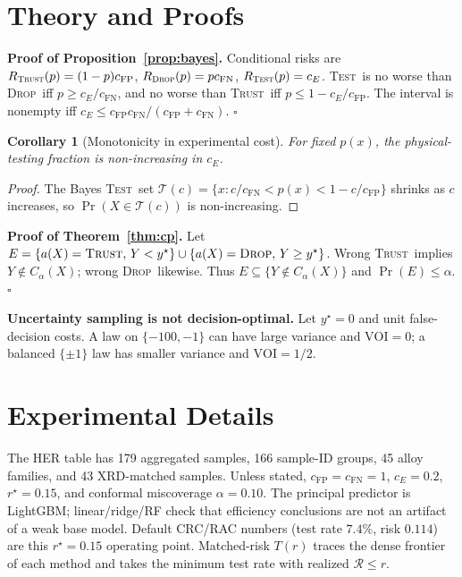 \documentclass{article}
\newtheorem{corollary}{Corollary}
\newcommand{\test}{\textsc{Test}}
\newcommand{\trust}{\textsc{Trust}}
\newcommand{\dropa}{\textsc{Drop}}
\newcommand{\risk}{\mathcal{R}}
\begin{document}
\newpage
\appendix

\section{Theory and Proofs}
\label{app:proofs}

\textbf{Proof of Proposition~\ref{prop:bayes}.}
Conditional risks are
$R_{\trust}(p)=(1-p)c_{\mathrm{FP}}$,
$R_{\dropa}(p)=pc_{\mathrm{FN}}$,
$R_{\test}(p)=c_E$.
\test\ is no worse than \dropa\ iff $p\ge c_E/c_{\mathrm{FN}}$, and no worse than \trust\ iff $p\le 1-c_E/c_{\mathrm{FP}}$.
The interval is nonempty iff
$c_E\le c_{\mathrm{FP}}c_{\mathrm{FN}}/(c_{\mathrm{FP}}+c_{\mathrm{FN}})$.
\hfill$\square$

\begin{corollary}[Monotonicity in experimental cost]
For fixed $p(x)$, the physical-testing fraction is non-increasing in $c_E$.
\end{corollary}

\begin{proof}
The Bayes \test\ set
$\mathcal{T}(c)=\{x: c/c_{\mathrm{FN}} < p(x) < 1-c/c_{\mathrm{FP}}\}$
shrinks as $c$ increases, so $\Pr(X\in\mathcal{T}(c))$ is non-increasing.
\end{proof}

\textbf{Proof of Theorem~\ref{thm:cp}.}
Let
$E=\{a(X)=\trust,\,Y<y^\star\}\cup\{a(X)=\dropa,\,Y\ge y^\star\}$.
Wrong \trust\ implies $Y\notin C_\alpha(X)$; wrong \dropa\ likewise.
Thus $E\subseteq\{Y\notin C_\alpha(X)\}$ and $\Pr(E)\le\alpha$.
\hfill$\square$

\textbf{Uncertainty sampling is not decision-optimal.}
Let $y^\star=0$ and unit false-decision costs.
A law on $\{-100,-1\}$ can have large variance and $\mathrm{VOI}=0$; a balanced $\{\pm 1\}$ law has smaller variance and $\mathrm{VOI}=1/2$.

\section{Experimental Details}
\label{app:details}

The HER table has 179 aggregated samples, 166 sample-ID groups, 45 alloy families, and 43 XRD-matched samples.
Unless stated, $c_{\mathrm{FP}}=c_{\mathrm{FN}}=1$, $c_E=0.2$, $r^\star=0.15$, and conformal miscoverage $\alpha=0.10$.
The principal predictor is LightGBM; linear/ridge/RF check that efficiency conclusions are not an artifact of a weak base model.
Default CRC/RAC numbers (test rate $7.4\%$, risk $0.114$) are this $r^\star=0.15$ operating point.
Matched-risk $T(r)$ traces the dense frontier of each method and takes the minimum test rate with realized $\risk\le r$.
\end{document}
